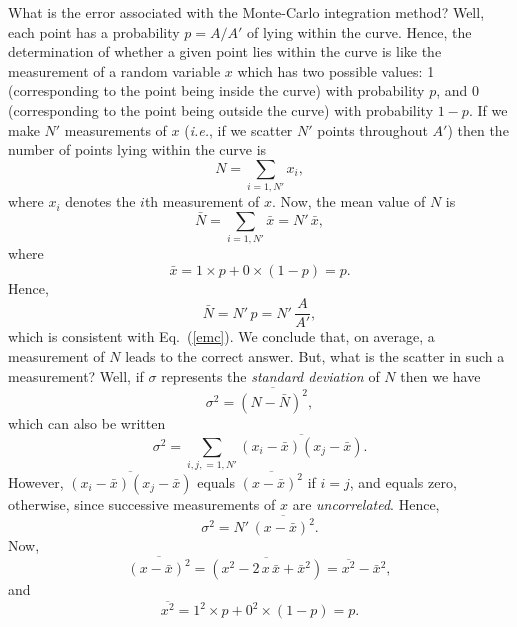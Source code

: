 What is the error associated with the Monte-Carlo integration method? Well, each
point has a probability $p=A/A'$ of lying within the curve. Hence, the determination
of whether a given point lies within the curve is like the measurement of a
random variable $x$ which has two possible values: 1 (corresponding to the point being inside the curve)
with probability $p$, and 0 (corresponding to the point being outside the curve) with probability
$1-p$. If we make $N'$ measurements of $x$ ({\em i.e.}, if we scatter $N'$ points
throughout $A'$) then the number of points lying within the curve is
\begin{equation}
N = \sum_{i=1,N'} x_i,
\end{equation}
where $x_i$ denotes the $i$th measurement of $x$. 
Now, the mean value of $N$ is
\begin{equation}
\bar{N} = \sum_{i=1,N'} \bar{x}= N'\,\bar{x},
\end{equation}
where 
\begin{equation}
\bar{x} = 1\times p + 0\times (1-p) = p.
\end{equation}
Hence,
\begin{equation}
\bar{N} = N'\,p = N'\,\frac{A}{A'},
\end{equation}
which is consistent with Eq.~(\ref{emc}). We conclude that, on average, a measurement of $N$
leads to the correct answer. 
But, what is the scatter in such a measurement? Well, if $\sigma$ represents
the {\em standard deviation} of $N$ then we have
\begin{equation}
\sigma^2 = \overline{(N-\bar{N})^2},
\end{equation}
which can also be written
\begin{equation}
\sigma^2 = \sum_{i,j,=1,N'} \overline{(x_i-\bar{x})(x_j-\bar{x})}.
\end{equation}
However, $\overline{(x_i-\bar{x})(x_j-\bar{x})}$ equals $\overline{(x-\bar{x})^2}$ if $i=j$, and
equals zero, otherwise, since successive measurements of $x$ are {\em uncorrelated}. Hence,
\begin{equation}
\sigma^2 = N'\,\overline{(x-\bar{x})^2}.
\end{equation}
Now,
\begin{equation}
\overline{(x-\bar{x})^2}=\overline{(x^2-2\,x\,\bar{x}+\bar{x}^2)} = \overline{x^2} - \bar{x}^2,
\end{equation}
and
\begin{equation}
\overline{x^2} = 1^2\times p + 0^2\times (1-p) = p.
\end{equation}
